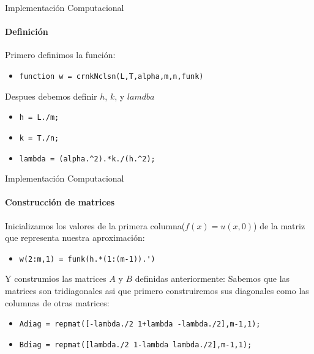 \documentclass{beamer}
\begin{document}
\begin{frame}{Implementación Computacional}
\framesubtitle{Definición}
Primero definimos la función:
\begin{itemize}
	\item \lstinline[style=Matlab-editor]!function w = crnkNclsn(L,T,alpha,m,n,funk)!
\end{itemize} 
Despues debemos definir $h$, $k$, y $lamdba$
\begin{itemize}
	\item \lstinline[style=Matlab-editor]!h = L./m;!
	\item \lstinline[style=Matlab-editor]!k = T./n;!
	\item \lstinline[style=Matlab-editor]!lambda = (alpha.^2).*k./(h.^2);!
\end{itemize}
\end{frame}
\begin{frame}{Implementación Computacional}
\framesubtitle{Construcción de matrices}
Inicializamos los valores de la primera columna($f(x)=u(x,0)$) de la matriz que representa nuestra aproximación:
\begin{itemize}
	\item \lstinline[style=Matlab-editor]!w(2:m,1) = funk(h.*(1:(m-1)).')!
\end{itemize}
Y construmios las matrices $A$ y $B$ definidas anteriormente:\newline
Sabemos que las matrices son tridiagonales asi que primero construiremos sus diagonales como las columnas de otras matrices:
\begin{itemize}
	\item \lstinline[style=Matlab-editor]!Adiag = repmat([-lambda./2 1+lambda -lambda./2],m-1,1);!
	\item \lstinline[style=Matlab-editor]!Bdiag = repmat([lambda./2 1-lambda lambda./2],m-1,1);!
\end{itemize}
\end{frame}
\end{document}
